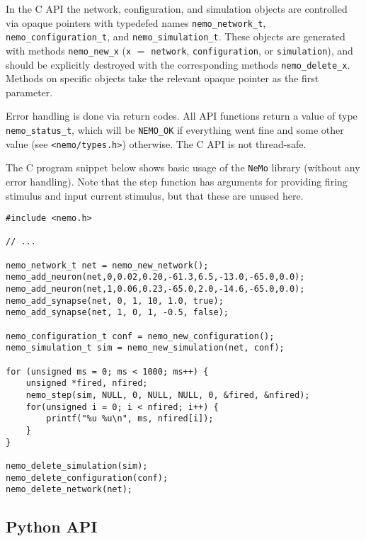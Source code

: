 \documentclass[a4paper]{article}
\newenvironment{mintframe}
  {\begin{mdframed}[linecolor=black, topline=true, bottomline=true,
    leftline=false, rightline=false, backgroundcolor=yellow!13!white,
    nobreak=true]
  }{
  \end{mdframed}
}
\newcommand{\nemo}{\texttt{NeMo}\xspace}
\newcommand{\code}[1]{\texttt{#1}}
\newcommand{\file}[1]{\texttt{#1}}
\begin{document}
In the C API the network, configuration, and simulation objects are controlled
via opaque pointers with typedefed names \code{nemo\_network\_t},
\code{nemo\_configuration\_t}, and \code{nemo\_simulation\_t}. These objects
are generated with methods \code{nemo\_new\_x} (\code{x} $=$ \code{network},
\code{configuration}, or \code{simulation}), and should be explicitly destroyed
with the corresponding methods \code{nemo\_delete\_x}. Methods on specific
objects take the relevant opaque pointer as the first parameter.

Error handling is done via return codes.  All API functions return a value of
type \code{nemo\_status\_t}, which will be \code{NEMO\_OK} if everything went
fine and some other value (see \file{<nemo/types.h>}) otherwise. The C API is
not thread-safe.

The C program snippet below shows basic usage of the \nemo library (without any
error handling). Note that the step function has arguments for providing firing
stimulus and input current stimulus, but that these are unused here.

\begin{mintframe}
\begin{verbatim}
#include <nemo.h>

// ...

nemo_network_t net = nemo_new_network();
nemo_add_neuron(net,0,0.02,0.20,-61.3,6.5,-13.0,-65.0,0.0);
nemo_add_neuron(net,1,0.06,0.23,-65.0,2.0,-14.6,-65.0,0.0);
nemo_add_synapse(net, 0, 1, 10, 1.0, true);
nemo_add_synapse(net, 1, 0, 1, -0.5, false);

nemo_configuration_t conf = nemo_new_configuration();
nemo_simulation_t sim = nemo_new_simulation(net, conf);

for (unsigned ms = 0; ms < 1000; ms++) {
    unsigned *fired, nfired;
    nemo_step(sim, NULL, 0, NULL, NULL, 0, &fired, &nfired);
    for(unsigned i = 0; i < nfired; i++) {
        printf("%u %u\n", ms, nfired[i]);
    }
}

nemo_delete_simulation(sim);
nemo_delete_configuration(conf);
nemo_delete_network(net);
\end{verbatim}
\end{mintframe}

\newpage

\subsection{Python API}
\label{sec:python}
\end{document}
